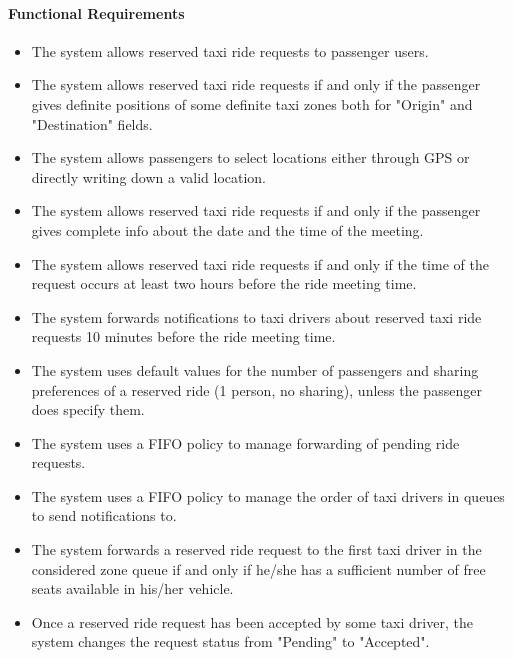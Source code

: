 \paragraph{Functional Requirements}
\begin{itemize}

	\item The system allows reserved taxi ride requests to passenger users.
	
	\item The system allows reserved taxi ride requests if and only if the passenger gives definite positions of some definite taxi zones both for "Origin" and "Destination" fields.
	
	\item The system allows passengers to select locations either through GPS or directly writing down a valid location.
	
	\item The system allows reserved taxi ride requests if and only if the passenger gives complete info about the date and the time of the meeting.
	
	\item The system allows reserved taxi ride requests if and only if the time of the request occurs at least two hours before the ride meeting time.
	
	\item The system forwards notifications to taxi drivers about reserved taxi ride requests 10 minutes before the ride meeting time.
	
	\item The system uses default values for the number of passengers and sharing preferences of a reserved ride (1 person, no sharing), unless the passenger does specify them.
	
	\item The system uses a FIFO policy to manage forwarding of pending ride requests.
	
	\item The system uses a FIFO policy to manage the order of taxi drivers in queues to send notifications to.
	
	\item The system forwards a reserved ride request to the first taxi driver in the considered zone queue if and only if he/she has a sufficient number of free seats available in his/her vehicle.
	
	\item Once a reserved ride request has been accepted by some taxi driver, the system changes the request status from "Pending" to "Accepted".
	

\end{itemize}
